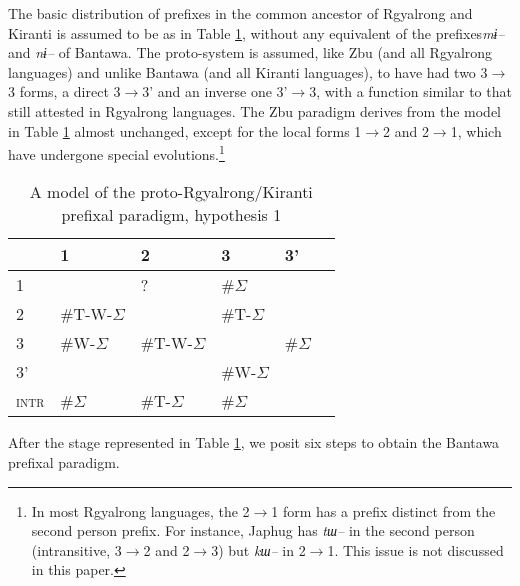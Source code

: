 \documentclass[twoside,a4paper,11pt]{article}
\newcommand{\ipa}[1]{{\phon\textit{#1}}}
\newcommand{\grise}[1]{\cellcolor{lightgray}\textbf{#1}}
\newcommand{\Σ}{\greek{Σ}}
\newcommand{\ro}{$\Sigma$}
\begin{document}
The basic distribution of prefixes in the common ancestor of Rgyalrong and Kiranti is assumed to be as in Table \ref{tab:proto.st1}, without any equivalent of the prefixes\ipa{mɨ--} and \ipa{nɨ--} of Bantawa. The proto-system is assumed, like Zbu (and all Rgyalrong languages) and unlike Bantawa (and all Kiranti languages), to have had two 3$\rightarrow$3 forms, a direct 3$\rightarrow$3' and an inverse one 3'$\rightarrow$3, with a function similar to that still attested in   Rgyalrong languages. The Zbu paradigm derives from the model in Table \ref{tab:proto.st1} almost unchanged, except for the local forms 1$\rightarrow$2 and 2$\rightarrow$1, which have undergone special evolutions.\footnote{In most Rgyalrong languages, the 2$\rightarrow$1 form has a  prefix distinct from the second person prefix. For instance, Japhug has   \ipa{tɯ--} in the second person (intransitive, 3$\rightarrow$2 and 2$\rightarrow$3) but \ipa{kɯ--} in 2$\rightarrow$1. This issue is not discussed in this paper.}


\begin{table}[H] 
\caption{A model of the proto-Rgyalrong/Kiranti prefixal paradigm, hypothesis 1} 
 \centering \label{tab:proto.st1}
\begin{tabular}{l|lllll} 
\toprule
&1 & 2 &3 & 3'\\
\hline
1 &\grise{} & ? &  \#\ro{} \\
2&\#T-W-\ro{} & \grise{} &\#T-\ro{}\\
3&\#W-\ro{} &\#T-W-\ro{} & \grise{} &\#\ro{} \\
3'&&&\#W-\ro{} \\
\hline
\textsc{intr}&\#\ro{}&\#T-\ro{}&\#\ro{}\\
\bottomrule
\end{tabular}
\end{table}
After the stage represented in Table \ref{tab:proto.st1}, we posit six steps to obtain the Bantawa prefixal paradigm.
\end{document}
